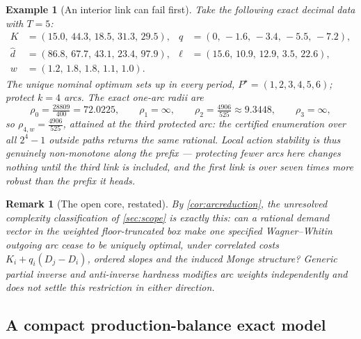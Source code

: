 \documentclass[11pt]{article}
\newtheorem{remark}[theorem]{Remark}
\newtheorem{example}[theorem]{Example}
\theoremstyle{definition}
\newcommand{\dhat}{\widehat d}
\newcommand{\ellv}{\ell}
\begin{document}
\begin{example}[An interior link can fail first]\label{ex:interiorarc}
Take the following exact decimal data with $T=5$:
\begin{align*}
K&=(15.0,\,44.3,\,18.5,\,31.3,\,29.5), &
q&=(0,\,-1.6,\,-3.4,\,-5.5,\,-7.2),\\
\dhat&=(86.8,\,67.7,\,43.1,\,23.4,\,97.9), &
\ellv&=(15.6,\,10.9,\,12.9,\,3.5,\,22.6),\\
w&=(1.2,\,1.8,\,1.8,\,1.1,\,1.0).&&
\end{align*}
The unique nominal optimum sets up in every period,
$P^\star=(1,2,3,4,5,6)$; protect $k=4$ arcs. The exact
one-arc radii are
\[
\rho_0=\tfrac{28809}{400}=72.0225,
\qquad
\rho_1=\infty,
\qquad
\rho_2=\tfrac{4906}{525}\approx9.3448,
\qquad
\rho_3=\infty,
\]
so $\rho_{4,w}=\tfrac{4906}{525}$, attained at the \emph{third} protected
arc: the certified enumeration over all $2^{4}-1$ outside paths returns
the same rational. Local action stability is thus genuinely
non-monotone along the prefix --- protecting fewer arcs here changes
nothing until the third link is included, and the first link is over
seven times more robust than the prefix it heads.
\end{example}

\begin{remark}[The open core, restated]\label{rem:opencore}
By \cref{cor:arcreduction}, the unresolved complexity classification of
\cref{sec:scope} is exactly this: can a rational demand vector in the
weighted floor-truncated box make one specified Wagner--Whitin outgoing
arc cease to be uniquely optimal, under correlated costs
$K_i+q_i(D_j-D_i)$, ordered slopes and the induced Monge structure?
Generic partial inverse and anti-inverse hardness
\parencite{Gassner2009,LeyMerkert2025} modifies arc weights
independently and does not settle this restriction in either direction.
\end{remark}

\subsection{A compact production-balance exact model}\label{sec:compact}
\end{document}
